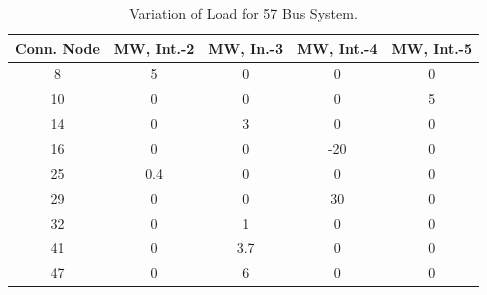 \documentclass[preprint,12pt,3p]{elsarticle}
\begin{document}
\begin{table}[ht] 

\caption{Variation of Load for 57 Bus System.} %

\centering %

\begin{tabular}{| c | c | c | c | c |} %

\hline\hline %

Conn. Node & MW, Int.-2 & MW, In.-3 & MW, Int.-4  & MW, Int.-5 \\ [0.5ex] %


\hline %

8 &	5 &	0 &	0 &	0 \\ %
\hline
10 &	0 &	0 &	0 &	5 \\ %
\hline
14 &	0 &	3 &	0 &	0 \\ %
\hline
16 &	0 &	0 &	-20 &	0 \\ %
\hline
25 &	0.4 &	0 &	0 &	0 \\ %
\hline
29 &	0 &	0 &	30 &	0 \\ %
\hline
32 &	0 &	1 &	0 &	0 \\ %
\hline
41 &	0 &	3.7 &	0 &	0 \\ %
\hline
47 &	0 &	6 &	0 &	0 \\ %
\hline
\end{tabular} 

\label{table:57LASCOPFLoadModified} %

\end{table}
\end{document}

